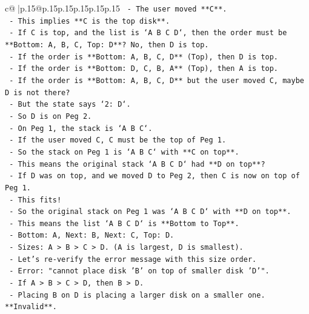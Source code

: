\documentclass{article}
\begin{document}
{\begin{supertabular}{c@{$\;$}|p{.15\linewidth}@{}p{.15\linewidth}p{.15\linewidth}p{.15\linewidth}p{.15\linewidth}p{.15\linewidth}}
{{{\texttt{            {-} The user moved **C**.} \\
\texttt{            {-} This implies **C is the top disk**.} \\
\texttt{            {-} If C is top, and the list is `A B C D`, then the order must be **Bottom: A, B, C, Top: D**? No, then D is top.} \\
\texttt{            {-} If the order is **Bottom: A, B, C, D** (Top), then D is top.} \\
\texttt{            {-} If the order is **Bottom: D, C, B, A** (Top), then A is top.} \\
\texttt{            {-} If the order is **Bottom: A, B, C, D** but the user moved C, maybe D is not there?} \\
\texttt{            {-} But the state says `2: D`.} \\
\texttt{            {-} So D is on Peg 2.} \\
\texttt{            {-} On Peg 1, the stack is `A B C`.} \\
\texttt{            {-} If the user moved C, C must be the top of Peg 1.} \\
\texttt{            {-} So the stack on Peg 1 is `A B C` with **C on top**.} \\
\texttt{            {-} This means the original stack `A B C D` had **D on top**?} \\
\texttt{            {-} If D was on top, and we moved D to Peg 2, then C is now on top of Peg 1.} \\
\texttt{            {-} This fits!} \\
\texttt{            {-} So the original stack on Peg 1 was `A B C D` with **D on top**.} \\
\texttt{            {-} This means the list `A B C D` is **Bottom to Top**.} \\
\texttt{            {-} Bottom: A, Next: B, Next: C, Top: D.} \\
\texttt{            {-} Sizes: A > B > C > D. (A is largest, D is smallest).} \\
\texttt{            {-} Let's re{-}verify the error message with this size order.} \\
\texttt{            {-} Error: "cannot place disk 'B' on top of smaller disk 'D'".} \\
\texttt{            {-} If A > B > C > D, then B > D.} \\
\texttt{            {-} Placing B on D is placing a larger disk on a smaller one. **Invalid**.} \\
}}}
\end{supertabular}}
\end{document}
